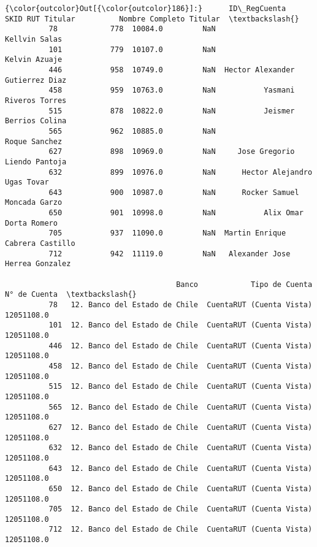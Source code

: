 \documentclass[11pt]{article}
\begin{document}
\begin{Verbatim}[commandchars=\\\{\}]
{\color{outcolor}Out[{\color{outcolor}186}]:}      ID\_RegCuenta     SKID RUT Titular          Nombre Completo Titular  \textbackslash{}
          78            778  10084.0         NaN                    Kellvin Salas   
          101           779  10107.0         NaN                    Kelvin Azuaje   
          446           958  10749.0         NaN  Hector Alexander Gutierrez Diaz   
          458           959  10763.0         NaN           Yasmani Riveros Torres   
          515           878  10822.0         NaN           Jeismer Berrios Colina   
          565           962  10885.0         NaN                   Roque Sanchez    
          627           898  10969.0         NaN     Jose Gregorio Liendo Pantoja   
          632           899  10976.0         NaN      Hector Alejandro Ugas Tovar   
          643           900  10987.0         NaN      Rocker Samuel Moncada Garzo   
          650           901  10998.0         NaN           Alix Omar Dorta Romero   
          705           937  11090.0         NaN  Martin Enrique Cabrera Castillo   
          712           942  11119.0         NaN   Alexander Jose Herrea Gonzalez   
          
                                       Banco            Tipo de Cuenta  N° de Cuenta  \textbackslash{}
          78   12. Banco del Estado de Chile  CuentaRUT (Cuenta Vista)    12051108.0   
          101  12. Banco del Estado de Chile  CuentaRUT (Cuenta Vista)    12051108.0   
          446  12. Banco del Estado de Chile  CuentaRUT (Cuenta Vista)    12051108.0   
          458  12. Banco del Estado de Chile  CuentaRUT (Cuenta Vista)    12051108.0   
          515  12. Banco del Estado de Chile  CuentaRUT (Cuenta Vista)    12051108.0   
          565  12. Banco del Estado de Chile  CuentaRUT (Cuenta Vista)    12051108.0   
          627  12. Banco del Estado de Chile  CuentaRUT (Cuenta Vista)    12051108.0   
          632  12. Banco del Estado de Chile  CuentaRUT (Cuenta Vista)    12051108.0   
          643  12. Banco del Estado de Chile  CuentaRUT (Cuenta Vista)    12051108.0   
          650  12. Banco del Estado de Chile  CuentaRUT (Cuenta Vista)    12051108.0   
          705  12. Banco del Estado de Chile  CuentaRUT (Cuenta Vista)    12051108.0   
          712  12. Banco del Estado de Chile  CuentaRUT (Cuenta Vista)    12051108.0   
          

\end{Verbatim}
\end{document}
